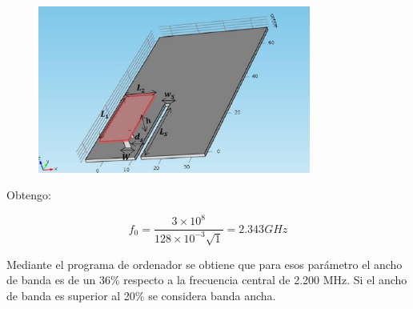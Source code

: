 \documentclass[a4paper,11pt,titlepage]{article}
\begin{document}
\begin{figure}[H]
\centering
\includegraphics[width=0.8\textwidth]{parametrosmulti}
\end{figure}
Obtengo: \par
$$f_0=\frac{3\times 10^{8}}{128 \times 10^{-3}\sqrt{1}}=2.343 GHz$$
\par
Mediante el programa de ordenador se obtiene que para esos parámetro el ancho de banda es de un 36\% respecto a la frecuencia central de 2.200 MHz. Si el ancho de banda es superior al 20\% se considera banda ancha.


\end{document}
